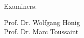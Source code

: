 \begin{center}
\begin{minipage}[b]{0.35\textwidth}
    Examiners:              \\
    \begin{hsheadfont}
    Prof. Dr. Wolfgang Hönig \\ 
    Prof. Dr. Marc Toussaint \\
    \end{hsheadfont}
\end{minipage}
\end{center}
    














\restoregeometry
